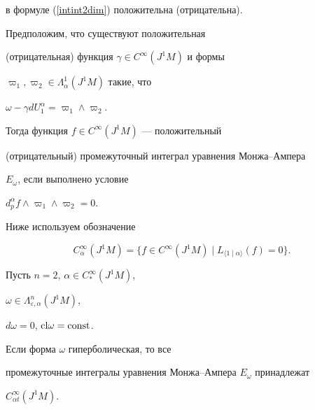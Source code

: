 в формуле (\ref{intint2dim}) положительна (отрицательна).





\begin{note}


Предположим, что существуют положительная 


(отрицательная) функция $\gamma \in C^\infty (J^1M)$ и формы


$\varpi_1,\varpi_2\in \Lambda_\alpha^1(J^1M)$ такие, что 


$\omega -\gamma dU_1^\alpha=\varpi_1\wedge \varpi_2$.


Тогда функция $f\in C^\infty (J^1M)$ --- положительный


(отрицательный) промежуточный интеграл уравнения Монжа--Ампера


$E_\omega $, если выполнено условие


$d_p^\alpha f\wedge \varpi_1\wedge \varpi_2=0.$


\end{note}





Ниже используем обозначение


$$


C_\alpha^\infty (J^1M)=\{f\in C^\infty (J^1M)\mid L_{\langle 1\mid \alpha


\rangle}(f)=0\}. 


$$





\begin{lem}


Пусть $n=2$, $\alpha \in C_{*}^\infty (J^1M)$,


$\omega \in \Lambda_{\varepsilon ,\alpha }^n(J^1M)$,


$d\omega =0$, ${\operatorname{cl}}\omega ={\operatorname{const}}$.


Если форма $\omega $ гиперболическая, то все


промежуточные интегралы уравнения Монжа--Ампера $E_\omega$ принадлежат


$C_{\alpha t}^\infty (J^1M)$.


\end{lem}





